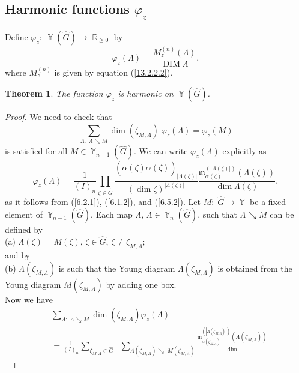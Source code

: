 \documentclass[12pt]{amsart}
\newtheorem{thm}{Theorem}[section]
\theoremstyle{definition}
\numberwithin{equation}{section}
\DeclareMathOperator{\R}{\mathbb{R}}
\DeclareMathOperator{\Y}{\mathbb{Y}}
\DeclareMathOperator{\DIM}{DIM}
\begin{document}
\subsection{Harmonic functions $\varphi_z$}
Define $\varphi_z:\; \Y(\widehat{G})\rightarrow\R_{\geq 0}$ by
\begin{equation}\label{6.5.2}
\varphi_z(\Lambda)=\frac{M_z^{(n)}(\Lambda)}{\DIM\Lambda},
\end{equation}
where $M_z^{(n)}$ is given by equation (\ref{13.2.2.2}).
\begin{thm}\label{THEOREM6.5.2}The function $\varphi_z$ is harmonic on $\Y(\widehat{G})$.
\end{thm}
\begin{proof} We need to check that
\begin{equation}\label{6.5.3}
\sum\limits_{\Lambda:\; \Lambda\searrow M}
\dim(\zeta_{M,\Lambda})\;\varphi_z(\Lambda)=\varphi_z(M)
\end{equation}
is satisfied for all $M\in\Y_{n-1}(\widehat{G})$. We can write $\varphi_z(\Lambda)$ explicitly as
\begin{equation}\label{6.5.3.1}
\varphi_z(\Lambda)=\frac{1}{(I)_n}
\prod\limits_{\zeta\in\widehat{G}}\frac{(\alpha(\zeta)
\overline{\alpha(\zeta)})_{|\Lambda(\zeta)|}}{\left(\dim\zeta\right)^{|\Lambda(\zeta)|}}
\frac{\mathfrak{m}_{\alpha(\zeta)}^{(|\Lambda(\zeta)|)}(\Lambda(\zeta))}{\dim\Lambda(\zeta)},
\end{equation}
as it follows from (\ref{6.2.1}), (\ref{6.1.2}), and (\ref{6.5.2}). Let $M:\; \widehat{G}\longrightarrow \Y$
be a fixed element of $\Y_{n-1}(\widehat{G})$. Each map $\Lambda$, $\Lambda\in\Y_n(\widehat{G})$, such that $\Lambda\searrow M$
can be defined by \\
(a) $\Lambda(\zeta)=M(\zeta)$, $\zeta\in\widehat{G}$, $\zeta\neq \zeta_{M,\Lambda}$;\\
and by\\
(b) $\Lambda(\zeta_{M,\Lambda})$ is such that the Young diagram $\Lambda(\zeta_{M,\Lambda})$ is obtained from the Young diagram  $M(\zeta_{M,\Lambda})$ by adding one box.\\
Now we have
\begin{equation}\label{6.5.4}
\begin{split}
&\sum\limits_{\Lambda:\;\Lambda\searrow M}\dim(\zeta_{M,\Lambda})\varphi_z(\Lambda)\\
&=\frac{1}{(I)_n}
\sum\limits_{\zeta_{M,\Lambda}\in\widehat{G}}\;\;
\sum\limits_{\Lambda(\zeta_{M,\Lambda})\searrow\; M(\zeta_{M,\Lambda})}
\frac{\mathfrak{m}_{\alpha(\zeta_{M,\Lambda})}^{(|\Lambda(\zeta_{M,\Lambda})|)}(\Lambda(\zeta_{M,\Lambda}))}{\dim
}
\end{split}
\end{equation}
\end{proof}
\end{document}
